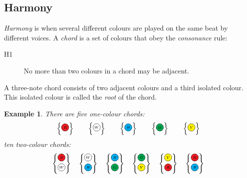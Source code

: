 \documentclass{scrartcl}
\newcommand{\RRR}{
  \begin{tikzpicture}
    \node[circle, draw, fill=Red, inner sep= 0pt, text width=1em, align=center] (n) at (0,0) {$\scriptscriptstyle R$};
  \end{tikzpicture}
}
\newcommand{\WWW}{
  \begin{tikzpicture}
    \node[circle, draw, fill=White,  inner sep= 0pt, text width=1em, align=center] (n) at (0,0) {$\scriptscriptstyle W$};
  \end{tikzpicture}
}
\newcommand{\BBB}{
  \begin{tikzpicture}
    \node[circle, draw, fill=Cyan,  inner sep= 0pt, text width=1em, align=center] (n) at (0,0) {$\scriptscriptstyle B$};
  \end{tikzpicture}
}
\newcommand{\GGG}{
  \begin{tikzpicture}
    \node[circle, draw, fill=Green,  inner sep= 0pt, text width=1em, align=center] (n) at (0,0) {$\scriptscriptstyle G$};
  \end{tikzpicture}
}
\newcommand{\YYY}{
  \begin{tikzpicture}
    \node[circle, draw, fill=Yellow,  inner sep= 0pt, text width=1em, align=center] (n) at (0,0) {$\scriptscriptstyle Y$};
  \end{tikzpicture}
}
\newtheorem{example}{Example}
\numberwithin{example}{section}
\begin{document}
\subsection{Harmony}
\emph{Harmony} is when several different colours are played on the same beat by different voices. A \emph{chord} is a set of colours that obey the \emph{consonance} rule:
\begin{description}
	\item[H1] No more than two colours in a chord may be adjacent.
\end{description}
A three-note chord consists of two adjacent colours and a third isolated colour. This isolated colour is called the \emph{root} of the chord.
\begin{example}
There are five one-colour chords:
\begin{equation}\nonumber
\begin{Bmatrix}\RRR\end{Bmatrix}
\qquad
\begin{Bmatrix}\WWW\end{Bmatrix}
\qquad
\begin{Bmatrix}\BBB\end{Bmatrix}
\qquad
\begin{Bmatrix}\GGG\end{Bmatrix}
\qquad
\begin{Bmatrix}\YYY\end{Bmatrix}
\end{equation}
ten two-colour chords:
\begin{equation}\nonumber
\begin{Bmatrix}
\RRR \\ \WWW
\end{Bmatrix}
\quad
\begin{Bmatrix}
\WWW \\ \BBB
\end{Bmatrix}
\quad
\begin{Bmatrix}
\BBB \\ \GGG
\end{Bmatrix}
\quad
\begin{Bmatrix}
\GGG \\ \YYY
\end{Bmatrix}
\quad
\begin{Bmatrix}
\YYY \\ \RRR
\end{Bmatrix}
\quad
\begin{Bmatrix}
\RRR \\ \BBB
\end{Bmatrix}

\end{equation}
\end{example}
\end{document}
